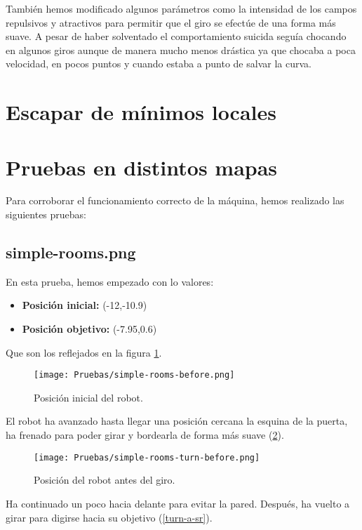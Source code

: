 \documentclass[a4paper, 11pt]{article}
\begin{document}
	También hemos modificado algunos parámetros como la intensidad de los campos repulsivos y atractivos
	para permitir que el giro se efectúe de una forma más suave. A pesar de haber solventado el
	comportamiento suicida seguía chocando en algunos giros aunque de manera mucho menos drástica ya
	que chocaba a poca velocidad, en pocos puntos y cuando estaba a punto de salvar la curva.

\section{Escapar de mínimos locales}

\section{Pruebas en distintos mapas}
	Para corroborar el funcionamiento correcto de la máquina, hemos realizado las siguientes pruebas:

	\subsection{simple-rooms.png}
		En esta prueba, hemos empezado con lo valores:
		
		\begin{itemize}
			\item \textbf{Posición inicial:} (-12,-10.9)
			\item \textbf{Posición objetivo:} (-7.95,0.6)
		\end{itemize}
		
		Que son los reflejados en la figura \ref{begin-sr}.
		
		\begin{figure}[H]
			\centering
			\texttt{[image: Pruebas/simple-rooms-before.png]}
			\caption{Posición inicial del robot.}
			\label{begin-sr}	
		\end{figure}
		
		El robot ha avanzado hasta llegar una posición cercana la esquina de la puerta, ha frenado para
		poder girar y bordearla de forma más suave (\ref{turn-b-sr}).
		
		\begin{figure}[H]
			\centering
			\texttt{[image: Pruebas/simple-rooms-turn-before.png]}
			\caption{Posición del robot antes del giro.}
			\label{turn-b-sr}	
		\end{figure}
		
		Ha continuado un poco hacia delante para evitar la pared. Después, ha vuelto a girar para digirse
		hacia su objetivo (\ref{turn-a-sr}).
		
\end{document}
